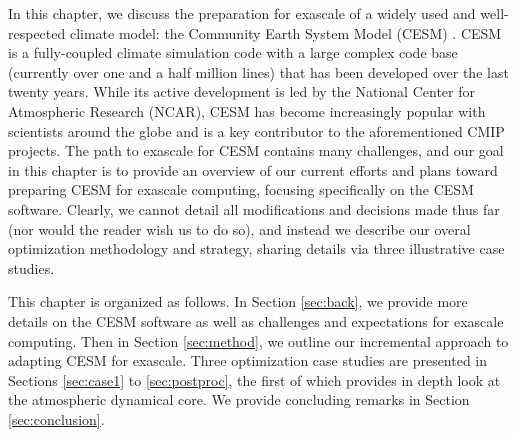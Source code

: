 In this chapter, we discuss the preparation for exascale of a widely used and well-respected climate model: the Community Earth System Model (CESM) \cite{cesm2013}.  CESM is a fully-coupled climate simulation code with a large complex code base (currently over one and a half million lines) that has been developed over the last twenty years.  While its active development is led by the National Center for Atmospheric Research (NCAR), CESM has become increasingly popular with scientists around the globe and is a key contributor to the aforementioned CMIP projects. 
The path to exascale for CESM contains many challenges, and our goal in this chapter is to provide an overview of our current efforts and plans toward preparing CESM for exascale computing, focusing specifically on the CESM software. Clearly, we cannot detail all modifications and decisions made thus far (nor would the reader wish us to do so), and instead we describe our overal optimization methodology and strategy, sharing details via three illustrative case studies.

This chapter is organized as follows. In Section \ref{sec:back}, we provide more details on the CESM software as well as challenges and expectations for exascale computing.   Then in Section \ref{sec:method}, we outline our incremental approach to adapting CESM for exascale.  Three optimization case studies are presented in Sections \ref{sec:case1} to \ref{sec:postproc}, the first of which provides in depth look at the atmospheric dynamical core.  We provide concluding remarks in Section \ref{sec:conclusion}.

